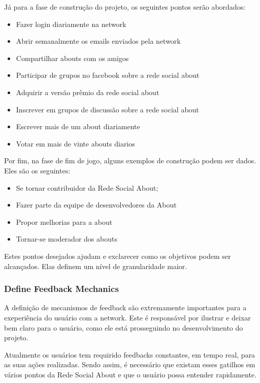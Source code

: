 Já para a fase de construção do projeto, os seguintes pontos serão
abordados:

\begin{itemize}
    \item Fazer login diariamente na network
    \item Abrir semanalmente os emails enviados pela network
    \item Compartilhar abouts com os amigos
    \item Participar de grupos no facebook sobre a rede social about
    \item Adquirir a versão prêmio da rede social about
    \item Inscrever em grupos de discussão sobre a rede social about
    \item Escrever mais de um about diariamente
    \item Votar em mais de vinte abouts diarios
\end{itemize}

Por fim, na fase de fim de jogo, alguns exemplos de construção podem ser dados. Eles são os seguintes:
\begin{itemize}
    \item Se tornar contribuidor da Rede Social About;
    \item Fazer parte da equipe de desenvolvedores da About
    \item Propor melhorias para a about
    \item Tornar-se moderador dos abouts
\end{itemize}

Estes pontos desejados ajudam e exclarecer como os objetivos podem ser alcançados. Elas 
definem um nível de granularidade maior.

\subsubsection{Define Feedback Mechanics}
\label{sub:define_feedback_mechanics}
A definição de mecanismos de feedback são extremamente importantes para a exeperiência 
do usuário
com a network. Este é responsável por ilustrar e deixar bem claro para o usuário, como 
ele está prosseguindo no desenvolvimento do projeto.

Atualmente os usuários tem requirido feedbacks constantes, em tempo real, para as suas 
ações
realizadas. Sendo assim, é necessário que existam esses gatilhos em vários pontos da
Rede Social About e que o usuário possa entender rapidamente.

